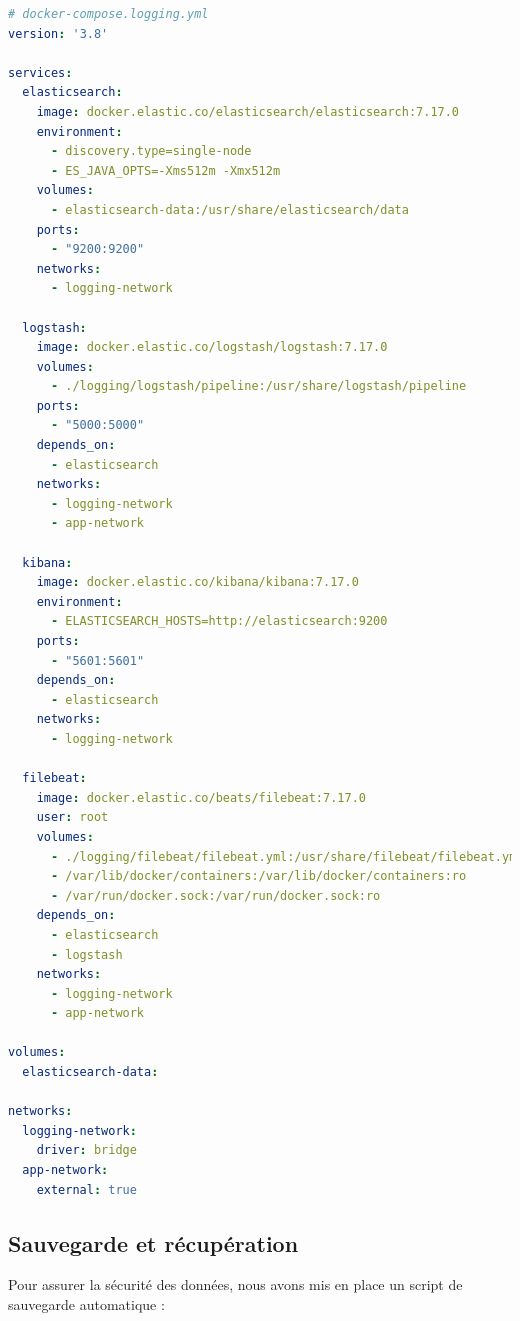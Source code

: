 \begin{lstlisting}[style=codestyle, language=YAML]
# docker-compose.logging.yml
version: '3.8'

services:
  elasticsearch:
    image: docker.elastic.co/elasticsearch/elasticsearch:7.17.0
    environment:
      - discovery.type=single-node
      - ES_JAVA_OPTS=-Xms512m -Xmx512m
    volumes:
      - elasticsearch-data:/usr/share/elasticsearch/data
    ports:
      - "9200:9200"
    networks:
      - logging-network

  logstash:
    image: docker.elastic.co/logstash/logstash:7.17.0
    volumes:
      - ./logging/logstash/pipeline:/usr/share/logstash/pipeline
    ports:
      - "5000:5000"
    depends_on:
      - elasticsearch
    networks:
      - logging-network
      - app-network

  kibana:
    image: docker.elastic.co/kibana/kibana:7.17.0
    environment:
      - ELASTICSEARCH_HOSTS=http://elasticsearch:9200
    ports:
      - "5601:5601"
    depends_on:
      - elasticsearch
    networks:
      - logging-network

  filebeat:
    image: docker.elastic.co/beats/filebeat:7.17.0
    user: root
    volumes:
      - ./logging/filebeat/filebeat.yml:/usr/share/filebeat/filebeat.yml:ro
      - /var/lib/docker/containers:/var/lib/docker/containers:ro
      - /var/run/docker.sock:/var/run/docker.sock:ro
    depends_on:
      - elasticsearch
      - logstash
    networks:
      - logging-network
      - app-network

volumes:
  elasticsearch-data:

networks:
  logging-network:
    driver: bridge
  app-network:
    external: true
\end{lstlisting}

\subsection{Sauvegarde et récupération}

Pour assurer la sécurité des données, nous avons mis en place un script de sauvegarde automatique :

